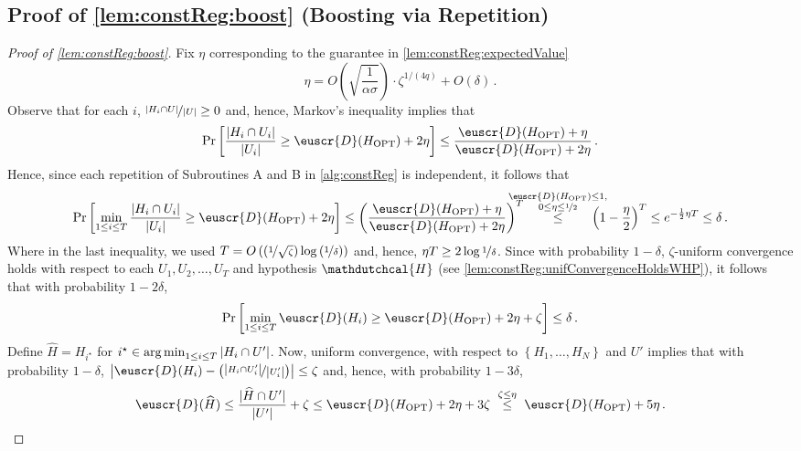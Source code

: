 \documentclass[11pt]{article}
\theoremstyle{plain}
\theoremstyle{definition}
\theoremstyle{remark}
\newcommand{\Stackrel}[2]{\stackrel{\mathmakebox[\widthof{\ensuremath{#2}}]{#1}}{#2}}
\def\abs#1{\left| #1 \right|}
\def\sabs#1{| #1 |}
\newcommand{\sinparen}[1]{(#1)}
\newcommand{\inbrace}[1]{\left\{#1\right\}}
\newcommand{\inparen}[1]{\left(#1\right)}
\newcommand{\insquare}[1]{\left[#1\right]}
\newcommand{\argmin}{\operatornamewithlimits{arg\,min}}
\newcommand{\nfrac}[2]{\nicefrac{#1}{#2}}
\newcommand{\opt}{\ensuremath{\mathrm{OPT}}}
\newcommand{\wh}[1]{\widehat{#1}}
\newcommand{\customcal}[1]{\euscr{#1}}
\newcommand{\cD}{\customcal{D}}
\newcommand{\hypo}[1]{\mathdutchcal{#1}}
\newcommand{\hyH}{\hypo{H}}
\newcommand{\cDgiven}{\cD}
\begin{document}
            
    \subsection{Proof of \cref{lem:constReg:boost} (Boosting via Repetition)}\label{sec:proofof:lem:constReg:boost}
                \begin{proof}[Proof of \cref{lem:constReg:boost}]
                Fix $\eta$ corresponding to the guarantee in \cref{lem:constReg:expectedValue}
                \[
                    \eta= O\inparen{\sqrt{\frac{1}{\alpha\sigma}}} \cdot \zeta^{1/(4q)}
                        + O\sinparen{\delta}\,.
                \]
                Observe that for each $i$, $\nfrac{\abs{H_i\cap U}}{\abs{U}}\geq 0$ and, hence, Markov's inequality implies that 
                \[
                    \Pr\insquare{\frac{\abs{H_i\cap U_i}}{\abs{U_i}} 
                    \geq \cD(H_{\opt})+2\eta} 
                    \leq {\frac{\cD(H_{\opt})+\eta}{\cD(H_{\opt})+2\eta}}\,.
                \]
                Hence, since each repetition of Subroutines A and B in \cref{alg:constReg} is independent, it follows that 
                \[
                    \Pr\insquare{
                        \min_{1\leq i\leq T}
                    \frac{\abs{H_i\cap U_i}}{\abs{U_i}} \geq \cD(H_{\opt})+2\eta 
                    } 
                    \leq \inparen{{\frac{\cD(H_{\opt})+\eta}{\cD(H_{\opt})+2\eta}}}^T
                    ~~~~~~\Stackrel{\substack{\cD(H_{\opt})\leq 1,\\0\leq\eta\leq \nfrac{1}{2}}}{\leq}~~~~~~ 
                        \inparen{1-\frac{\eta}{2}}^T
                    \leq e^{-\frac{1}{2}\eta T}
                    \leq \delta
                    \,.
                \]
                Where in the last inequality, we used $T=O\inparen{\inparen{\nfrac{1}{\sqrt{\zeta}}}\log\inparen{\nfrac{1}{\delta}}}$ and, hence, $\eta T\geq 2\log{\nfrac{1}{\delta}}$.
                Since with probability $1-\delta$, $\zeta$-uniform convergence holds with respect to each $U_1,U_2,\dots,U_T$ and hypothesis $\hyH$ (see \cref{lem:constReg:unifConvergenceHoldsWHP}), it follows that with probability $1-2\delta$,
                \[
                    \Pr\insquare{
                    \min_{1\leq i\leq T} \cD(H_i) \geq \cD(H_{\opt}) + 2\eta + \zeta
                    }
                    \leq \delta\,.
                \]
                Define $\wh{H}=H_{i^\star}$ for $i^\star\in \argmin_{1\leq i\leq T} \abs{H_i\cap U'}$.
                Now, uniform convergence, with respect to $\inbrace{H_1,\dots,H_N}$ and $U'$ implies that with probability $1-\delta$, $\abs{\cDgiven(H_i) - \inparen{\nfrac{\abs{H_i\cap U_i'}}{\abs{U_i'}}}}\leq \zeta$ and, hence, with probability $1-3\delta$,
                \[
                    \cD(\wh{H})
                    \leq \frac{\sabs{\wh{H}\cap U'}}{\abs{U'}} + \zeta
                    \leq \cD(H_{\opt}) + 2\eta + 3\zeta 
                    ~~\Stackrel{\zeta\leq \eta}{\leq}~~ \cDgiven(H_{\opt}) + 5\eta\,. 
                \] 
            \end{proof} 
     
\end{document}
